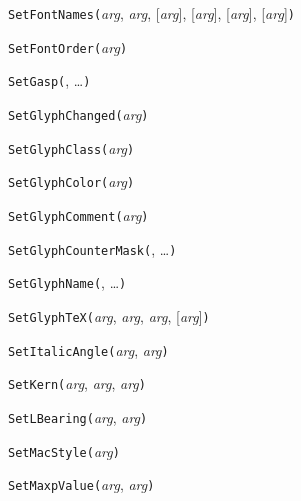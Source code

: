 
\noindent\texttt{SetFontNames(}\textit{arg}, \textit{arg}, [\textit{arg}], [\textit{arg}], [\textit{arg}], [\textit{arg}]\texttt{)}


\noindent\texttt{SetFontOrder(}\textit{arg}\texttt{)}


\noindent\texttt{SetGasp(}, \ldots\texttt{)}


\noindent\texttt{SetGlyphChanged(}\textit{arg}\texttt{)}


\noindent\texttt{SetGlyphClass(}\textit{arg}\texttt{)}


\noindent\texttt{SetGlyphColor(}\textit{arg}\texttt{)}


\noindent\texttt{SetGlyphComment(}\textit{arg}\texttt{)}


\noindent\texttt{SetGlyphCounterMask(}, \ldots\texttt{)}


\noindent\texttt{SetGlyphName(}, \ldots\texttt{)}


\noindent\texttt{SetGlyphTeX(}\textit{arg}, \textit{arg}, \textit{arg}, [\textit{arg}]\texttt{)}


\noindent\texttt{SetItalicAngle(}\textit{arg}, \textit{arg}\texttt{)}


\noindent\texttt{SetKern(}\textit{arg}, \textit{arg}, \textit{arg}\texttt{)}


\noindent\texttt{SetLBearing(}\textit{arg}, \textit{arg}\texttt{)}


\noindent\texttt{SetMacStyle(}\textit{arg}\texttt{)}


\noindent\texttt{SetMaxpValue(}\textit{arg}, \textit{arg}\texttt{)}

